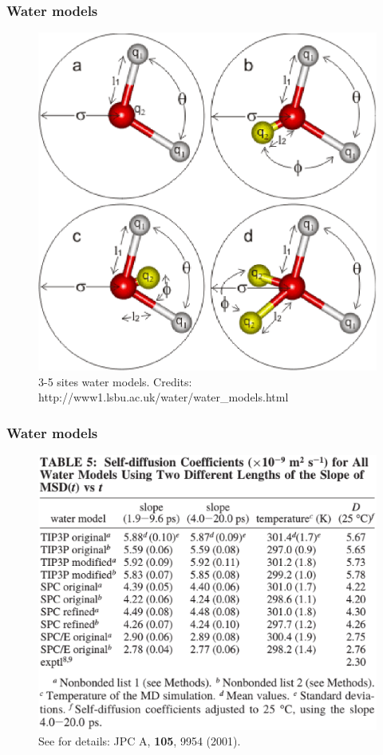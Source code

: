 \documentclass{beamer}
\begin{document}
\begin{frame}\frametitle{Water models}

\begin{figure}
\includegraphics[scale=0.34]{h2o_models.eps}
\caption{{\scriptsize 3-5 sites water models. Credits: http://www1.lsbu.ac.uk/water/water\_models.html}}
\end{figure}

\end{frame}


\begin{frame}\frametitle{Water models}

\begin{figure}
\includegraphics[scale=0.3]{nilsson_water.eps}
\caption{{\scriptsize See for details: JPC A, {\bf 105}, 9954 (2001). }}
\end{figure}

\end{frame}
\end{document}

